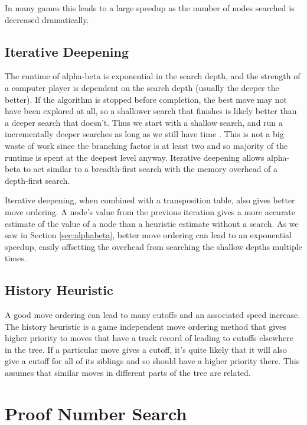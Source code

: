 In many games this leads to a large speedup as the number of nodes searched is decreased dramatically.


\subsection{Iterative Deepening}

The runtime of alpha-beta is exponential in the search depth, and the strength of a computer player is dependent on the search depth (usually the deeper the better). If the algorithm is stopped before completion, the best move may not have been explored at all, so a shallower search that finishes is likely better than a deeper search that doesn't. Thus we start with a shallow search, and run a incrementally deeper searches as long as we still have time \cite{slate1977chess}. This is not a big waste of work since the branching factor is at least two and so majority of the runtime is spent at the deepest level anyway. Iterative deepening allows alpha-beta to act similar to a breadth-first search with the memory overhead of a depth-first search.

Iterative deepening, when combined with a transposition table, also gives better move ordering. A node's value from the previous iteration gives a more accurate estimate of the value of a node than a heuristic estimate without a search. As we saw in Section \ref{sec:alphabeta}, better move ordering can lead to an exponential speedup, easily offsetting the overhead from searching the shallow depths multiple times.

\subsection{History Heuristic}

A good move ordering can lead to many cutoffs and an associated speed increase. The history heuristic \cite{schaeffer1989history} is a game independent move ordering method that gives higher priority to moves that have a track record of leading to cutoffs elsewhere in the tree. If a particular move gives a cutoff, it's quite likely that it will also give a cutoff for all of its siblings and so should have a higher priority there. This assumes that similar moves in different parts of the tree are related.




\section{Proof Number Search} \label{sec:PNS}

